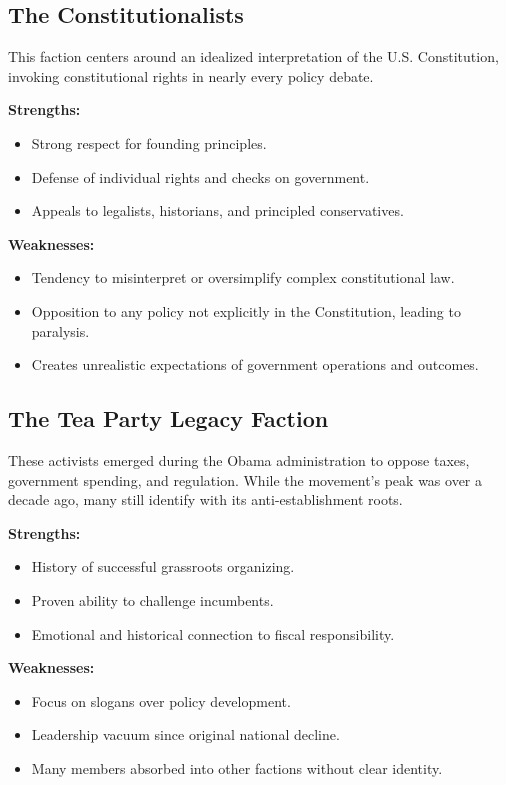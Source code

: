 \subsection{The Constitutionalists}
This faction centers around an idealized interpretation of the U.S. Constitution, invoking constitutional rights in nearly every policy debate.

\textbf{Strengths:}
\begin{itemize}
\item Strong respect for founding principles.
\item Defense of individual rights and checks on government.
\item Appeals to legalists, historians, and principled conservatives.
\end{itemize}

\textbf{Weaknesses:}
\begin{itemize}
\item Tendency to misinterpret or oversimplify complex constitutional law.
\item Opposition to any policy not explicitly in the Constitution, leading to paralysis.
\item Creates unrealistic expectations of government operations and outcomes.
\end{itemize}

\subsection{The Tea Party Legacy Faction}
These activists emerged during the Obama administration to oppose taxes, government spending, and regulation. While the movement’s peak was over a decade ago, many still identify with its anti-establishment roots.

\textbf{Strengths:}
\begin{itemize}
\item History of successful grassroots organizing.
\item Proven ability to challenge incumbents.
\item Emotional and historical connection to fiscal responsibility.
\end{itemize}

\textbf{Weaknesses:}
\begin{itemize}
\item Focus on slogans over policy development.
\item Leadership vacuum since original national decline.
\item Many members absorbed into other factions without clear identity.
\end{itemize}

